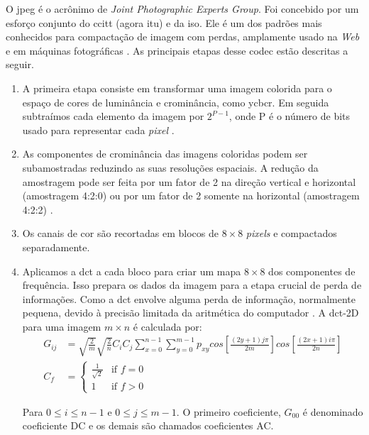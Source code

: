 O \acrshort{jpeg} é o acrônimo de \textit{Joint Photographic Experts Group}. Foi concebido por um esforço conjunto do \acrshort{ccitt} (agora \acrshort{itu}) e da \acrshort{iso}. Ele é um dos padrões mais conhecidos para compactação de imagem com perdas, amplamente usado na \textit{Web} e em máquinas fotográficas \cite{sayood2017introduction}. 
As principais etapas desse \acrshort{codec} estão descritas a seguir. 
\begin{enumerate}
	\item A primeira etapa consiste em transformar uma imagem colorida para o espaço de cores de luminância e crominância, como \acrshort{ycbcr}. Em seguida subtraímos cada elemento da imagem por $2^{P-1}$, onde P é o número de bits usado para representar cada \textit{pixel} \cite{sayood2017introduction}. 
	\item As componentes de crominância das imagens coloridas podem ser subamostradas reduzindo as suas resoluções espaciais. A redução da amostragem pode ser feita por um fator de 2 na direção vertical e horizontal (amostragem 4:2:0) ou por um fator de 2 somente na horizontal (amostragem 4:2:2) \cite{salomon2007data}. 
	\item Os canais de cor são recortadas em blocos de $8 \times 8$ \textit{pixels} e compactados separadamente. 
	\item Aplicamos a \gls{dct} a cada bloco para criar um mapa $8 \times 8$ dos componentes de frequência.
	Isso prepara os dados da imagem para a etapa crucial de perda de informações. Como a \acrshort{dct} envolve alguma perda de informação, normalmente pequena, devido à precisão limitada da aritmética do computador \cite{salomon2007data}. A \acrshort{dct}-2D para uma imagem $m \times n$ é calculada por:
	\begin{equation}
	\begin{aligned}
	G_{ij} &= \sqrt{\frac{2}{m}}\sqrt{\frac{2}{n}}C_iC_j\sum_{x=0}^{n-1}\sum_{y=0}^{m-1}p_{xy} cos\left [ \frac{(2y+1)j\pi}{2m} \right] cos\left [ \frac{(2x+1)i\pi}{2n} \right] \\
	C_f &=  \left\{
	\begin{array}{ll}
	\frac{1}{\sqrt{2}}  & \mbox{if } f = 0 \\
	1 & \mbox{if } f > 0
	\end{array}
	\right.
	\end{aligned}
	\end{equation}
	
	Para $0 \leq i \leq n - 1$ e $0 \leq j \leq m - 1$. O primeiro coeficiente, $G_{00}$ é denominado coeficiente DC e os demais são chamados coeficientes AC. 
	

\end{enumerate}
